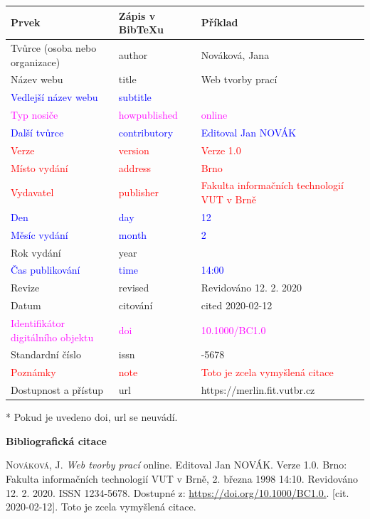 \begin{tabularx}{0.95\linewidth}{>{\raggedright\arraybackslash}X X >{\raggedright\arraybackslash}X}
    Prvek & Zápis v BibTeXu & Příklad\\\hline
    Tvůrce (osoba nebo organizace) & author & Nováková, Jana\\
    Název webu & title & Web tvorby prací\\
    \textcolor{blue}{Vedlejší název webu} &  \textcolor{blue}{subtitle} & \\
    \textcolor{magenta}{Typ nosiče} & \textcolor{magenta}{howpublished} & \textcolor{magenta}{online}\\
    \textcolor{blue}{Další tvůrce} & \textcolor{blue}{contributory} & \textcolor{blue}{Editoval Jan NOVÁK}\\
    \textcolor{red}{Verze} & \textcolor{red}{version} & \textcolor{red}{Verze 1.0}\\
    \textcolor{red}{Místo vydání} & \textcolor{red}{address} & \textcolor{red}{Brno}\\
    \textcolor{red}{Vydavatel} & \textcolor{red}{publisher} & \textcolor{red}{Fakulta informačních technologií VUT v Brně}\\
    \textcolor{blue}{Den} & \textcolor{blue}{day} & \textcolor{blue}{12}\\
    \textcolor{blue}{Měsíc vydání} & \textcolor{blue}{month} & \textcolor{blue}{2}\\
    Rok vydání & year & 2020\\
    \textcolor{blue}{Čas publikování} & \textcolor{blue}{time} & \textcolor{blue}{14:00}\\
    Revize & revised & Revidováno 12. 2. 2020\\
    Datum & citování & cited 2020-02-12\\
    \textcolor{magenta}{Identifikátor digitálního objektu} & \textcolor{magenta}{doi} & \textcolor{magenta}{10.1000/BC1.0}\\
    Standardní číslo & issn & 1234-5678\\
    \textcolor{red}{Poznámky} & \textcolor{red}{note} & \textcolor{red}{Toto je zcela vymyšlená citace}\\
    Dostupnost a přístup & url & https://merlin.fit.vutbr.cz
\end{tabularx}

\bigskip
* Pokud je uvedeno doi, url se neuvádí.

\bigskip

\noindent \textbf{Bibliografická citace}

\medskip

\noindent \textsc{Nováková}, J. \textit{Web tvorby prací} online. Editoval Jan NOVÁK. Verze 1.0. Brno: Fakulta informačních technologií VUT v Brně, 2. března 1998 14:10. Revidováno 12. 2. 2020. ISSN 1234-5678. Dostupné z: \url{https://doi.org/10.1000/BC1.0.}. [cit. 2020-02-12]. Toto je zcela vymyšlená citace.

%
\fi